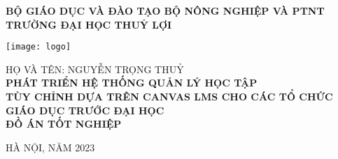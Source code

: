 \documentclass[main-report.tex]{subfiles}
\begin{document}
\begin{titlepage}
\thispagestyle{empty}
\thisfancypage{
\setlength{\fboxsep}{3pt}
\fbox}{} 
\begin{center}
{\bf\large BỘ GIÁO DỤC VÀ ĐÀO TẠO BỘ NÔNG NGHIỆP VÀ PTNT}\\
{\bf\subtitlesize TRƯỜNG ĐẠI HỌC THUỶ LỢI}\\[4cm]

{
\vspace*{-6\baselineskip}
\hspace*{0\textwidth}\texttt{[image: logo]}
\par\vspace*{4\baselineskip}
}
{\large HỌ VÀ TÊN: NGUYỄN TRỌNG THUỶ}\\
\vspace{4\baselineskip}
{\bf\Large PHÁT TRIỂN HỆ THỐNG QUẢN LÝ HỌC TẬP}\\
{\bf\Large TÙY CHỈNH DỰA TRÊN CANVAS LMS CHO CÁC TỔ CHỨC GIÁO DỤC TRƯỚC ĐẠI HỌC}\\[4cm]
{\bf ĐỒ ÁN TỐT NGHIỆP}\\
\end{center}
\vspace{6cm}
\begin{center}
{\large HÀ NỘI, NĂM 2023}
\end{center}
\end{titlepage}
\end{document}
